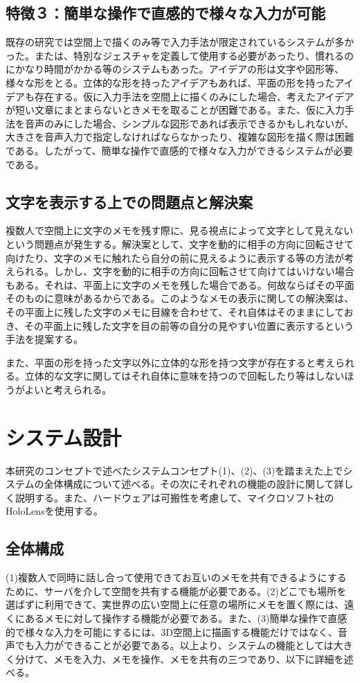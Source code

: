 \documentclass[technicalreport]{ieicej}
\begin{document}
\subsection*{特徴３：簡単な操作で直感的で様々な入力が可能}
既存の研究では空間上で描くのみ等で入力手法が限定されているシステムが多かった。または、特別なジェスチャを定義して使用する必要があったり、慣れるのにかなり時間がかかる等のシステムもあった。アイデアの形は文字や図形等、様々な形をとる。立体的な形を持ったアイデアもあれば、平面の形を持ったアイデアも存在する。仮に入力手法を空間上に描くのみにした場合、考えたアイデアが短い文章にまとまらないときメモを取ることが困難である。また、仮に入力手法を音声のみにした場合、シンプルな図形であれば表示できるかもしれないが、大きさを音声入力で指定しなければならなかったり、複雑な図形を描く際は困難である。したがって、簡単な操作で直感的で様々な入力ができるシステムが必要である。

\subsection{文字を表示する上での問題点と解決案} \label{moji_mondai}
複数人で空間上に文字のメモを残す際に、見る視点によって文字として見えないという問題点が発生する。解決案として、文字を動的に相手の方向に回転させて向けたり、文字のメモに触れたら自分の前に見えるように表示する等の方法が考えられる。しかし、文字を動的に相手の方向に回転させて向けてはいけない場合もある。それは、平面上に文字のメモを残した場合である。何故ならばその平面そのものに意味があるからである。このようなメモの表示に関しての解決案は、その平面上に残した文字のメモに目線を合わせて、それ自体はそのままにしておき、その平面上に残した文字を目の前等の自分の見やすい位置に表示するという手法を提案する。

また、平面の形を持った文字以外に立体的な形を持つ文字が存在すると考えられる。立体的な文字に関してはそれ自体に意味を持つので回転したり等はしないほうがよいと考えられる。

\section{システム設計}
本研究のコンセプトで述べたシステムコンセプト(1)、(2)、(3)を踏まえた上でシステムの全体構成について述べる。その次にそれぞれの機能の設計に関して詳しく説明する。また、ハードウェアは可搬性を考慮して、マイクロソフト社のHoloLensを使用する。

\subsection{全体構成}
(1)複数人で同時に話し合って使用できてお互いのメモを共有できるようにするために、サーバを介して空間を共有する機能が必要である。(2)どこでも場所を選ばずに利用できて、実世界の広い空間上に任意の場所にメモを置く際には、遠くにあるメモに対して操作する機能が必要である。また、(3)簡単な操作で直感的で様々な入力を可能にするには、3D空間上に描画する機能だけではなく、音声でも入力ができることが必要である。以上より、システムの機能としては大きく分けて、メモを入力、メモを操作、メモを共有の三つであり、以下に詳細を述べる。
\end{document}
